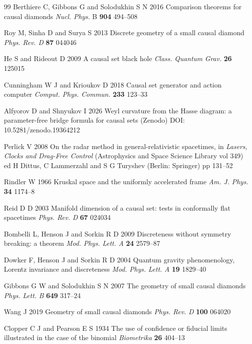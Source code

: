 \begin{thebibliography}{99}
 Berthiere C, Gibbons G and Solodukhin S N 2016 Comparison theorems for causal diamonds \textit{Nucl. Phys.} B \textbf{904} 494--508

 Roy M, Sinha D and Surya S 2013 Discrete geometry of a small causal diamond \textit{Phys. Rev. D} \textbf{87} 044046

 He S and Rideout D 2009 A causal set black hole \textit{Class. Quantum Grav.} \textbf{26} 125015

 Cunningham W J and Krioukov D 2018 Causal set generator and action computer \textit{Comput. Phys. Commun.} \textbf{233} 123--33

 Alfyorov D and Shnyukov I 2026 Weyl curvature from the Hasse diagram: a parameter-free bridge formula for causal sets (Zenodo) DOI: 10.5281/zenodo.19364212

 Perlick V 2008 On the radar method in general-relativistic spacetimes, in \textit{Lasers, Clocks and Drag-Free Control} (Astrophysics and Space Science Library vol 349) ed H Dittus, C Lammerzahl and S G Turyshev (Berlin: Springer) pp 131--52

 Rindler W 1966 Kruskal space and the uniformly accelerated frame \textit{Am. J. Phys.} \textbf{34} 1174--8

 Reid D D 2003 Manifold dimension of a causal set: tests in conformally flat spacetimes \textit{Phys. Rev. D} \textbf{67} 024034

 Bombelli L, Henson J and Sorkin R D 2009 Discreteness without symmetry breaking: a theorem \textit{Mod. Phys. Lett. A} \textbf{24} 2579--87

 Dowker F, Henson J and Sorkin R D 2004 Quantum gravity phenomenology, Lorentz invariance and discreteness \textit{Mod. Phys. Lett. A} \textbf{19} 1829--40

 Gibbons G W and Solodukhin S N 2007 The geometry of small causal diamonds \textit{Phys. Lett. B} \textbf{649} 317--24

 Wang J 2019 Geometry of small causal diamonds \textit{Phys. Rev. D} \textbf{100} 064020

 Clopper C J and Pearson E S 1934 The use of confidence or fiducial limits illustrated in the case of the binomial \textit{Biometrika} \textbf{26} 404--13


\end{thebibliography}
